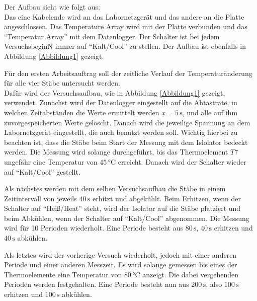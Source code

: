 \begin{flushleft}
    Der Aufbau sieht wie folgt aus:\\
    Das eine Kabelende wird an das Labornetzgerät und das andere an die Platte angeschlossen. 
    Das Temperature Array wird mit der Platte verbunden und das \enquote{Temperatur Array} mit dem Datenlogger.
    Der Schalter ist bei jedem VersuchsbeginN immer auf \enquote{Kalt/Cool} zu stellen. 
    Der Aufbau ist ebenfalls in Abbildung \ref{Abbildung1} gezeigt.
\end{flushleft}

\vspace{0.5cm}

\begin{flushleft}
    Für den ersten Arbeitsauftrag soll der zeitliche Verlauf der Temperaturänderung für alle vier Stäbe untersucht werden.\\
    Dafür wird der Versuchsaufbau, wie in Abbildung \ref{Abbildung1} gezeigt, verwendet.
    Zunächst wird der Datenlogger eingestellt auf die Abtastrate, in welchen Zeitabständen die Werte ermittelt werden $x=5\,\unit{\second}$, und alle auf ihm zuvorgespeicherten Werte gelöscht.
    Danach wird die jeweilige Spannung an dem Labornetzgerät eingestellt, die auch benutzt werden soll. 
    Wichtig hierbei zu beachten ist, dass die Stäbe beim Start der Messung mit dem Islolator bedeckt werden. 
    Die Messung wird solange durchgeführt, bis das Thermoelement $T7$ ungefähr eine Temperatur von $ 45\,\unit{\degreeCelsius} $ erreicht. 
    Danach wird der Schalter wieder auf \enquote{Kalt/Cool} gestellt.
\end{flushleft}

\vspace{0.5cm}


\begin{flushleft}
    Als nächstes werden mit dem selben Versuchsaufbau die Stäbe in einem Zeitintervall von jeweils $ 40\,\unit{\second} $ erhitzt und abgekühlt. 
    Beim Erhitzen, wenn der Schalter auf \enquote{Heiß/Heat} steht, wird der Isolator auf die Stäbe platziert und beim Abkühlen, wenn der Schalter auf \enquote{Kalt/Cool} abgenommen. 
    Die Messung wird für 10 Perioden wiederholt. Eine Periode besteht aus $ 80\,\unit{\second} $, $ 40\,\unit{\second} $ erhitzen und $ 40\,\unit{\second} $ abkühlen.
\end{flushleft}

\begin{flushleft}
    Als letztes wird der vorherige Versuch wiederholt, jedoch mit einer anderen Periode und einer anderen Messzeit.
    Es wird solange gemessen bis eines der Thermoelemente eine Temperatur von $ 80\,\unit{\degreeCelsius} $ anzeigt. 
    Die dabei vergehenden Perioden werden festgehalten.
    Eine Periode besteht nun aus $ 200\,\unit{\second} $, also $ 100\,\unit{\second} $ erhitzen und $ 100\,\unit{\second} $ abkühlen.
\end{flushleft}

